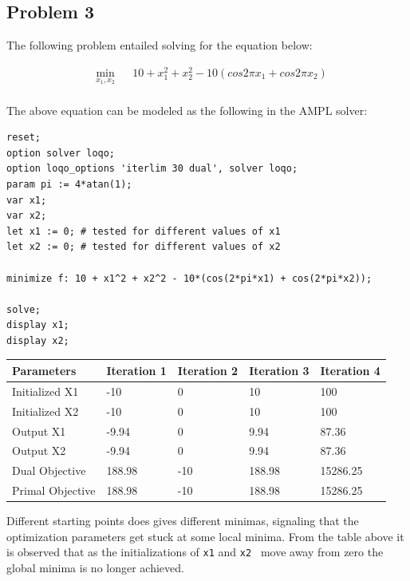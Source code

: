 \subsection{Problem 3}

The following problem entailed solving for the equation below:

\begin{equation*}
\begin{aligned}
& \underset{x_1,x_2}{\text{min}}
& & 10 + x_1^2  + x_2^2 - 10(cos 2\pi x_1 + cos 2 \pi x_2) \\ 
\end{aligned}
\end{equation*}

The above equation can be modeled as the following in the AMPL solver:

\begin{verbatim}
reset;
option solver loqo;
option loqo_options 'iterlim 30 dual', solver loqo;
param pi := 4*atan(1);
var x1;
var x2;
let x1 := 0; # tested for different values of x1
let x2 := 0; # tested for different values of x2

minimize f: 10 + x1^2 + x2^2 - 10*(cos(2*pi*x1) + cos(2*pi*x2));

solve;
display x1;
display x2;\end{verbatim}

\begin{center}
	\begin{tabu} to 0.95\textwidth { |X[c]|X[c]X[c]X[c]X[c]| }
		\hline
		Parameters & Iteration 1 & Iteration 2 & Iteration 3 & Iteration 4 \\
		\hline
		Initialized X1 & -10 & 0 & 10 & 100 \\
		Initialized X2  & -10 & 0 & 10 & 100 \\
		Output X1 & -9.94 & 0 & 9.94 & 87.36 \\
		Output X2 & -9.94& 0 & 9.94 & 87.36 \\
		Dual Objective & 188.98 & -10 & 188.98 & 15286.25 \\
		Primal Objective &188.98 & -10 & 188.98 & 15286.25 \\
		\hline
	\end{tabu}
\end{center}

Different starting points does gives different minimas, signaling that the optimization parameters get stuck at some local minima. From the table above it is observed that as the initializations of \texttt{x1} and \texttt{x2 } move away from zero the global minima is no longer achieved.


